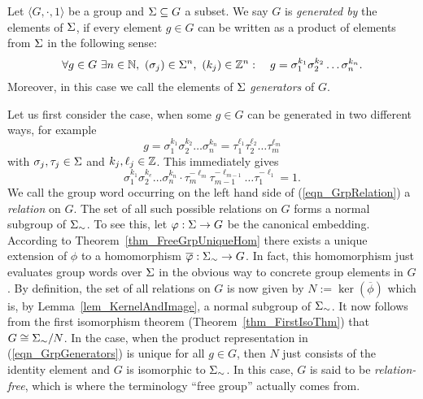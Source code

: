\begin{definition}
Let $\langle G, \cdot, 1 \rangle$ be a group and $\Sigma \subseteq G$ a subset. We say $G$ is \emph{generated by} the elements of $\Sigma$, if every element $g \in G$ can be written as a product of elements from $\Sigma$ in the following sense:
\begin{equation}
\label{eqn_GrpGenerators}
\forall g \in G\ \exists n \in \mathbb{N},\ (\sigma_j) \in \Sigma^n,\ (k_j) \in \mathbb{Z}^n:\quad 
g = \sigma_1^{k_1} \sigma_2^{k_2} \dots \sigma_n^{k_n}.
\end{equation}
Moreover, in this case we call the elements of $\Sigma$ \emph{generators} of $G$. 
\end{definition}

Let us first consider the case, when some $g \in G$ can be generated in two  different ways, for example
\begin{equation*}
g = \sigma_1^{k_1} \sigma_2^{k_2} \dots \sigma_n^{k_n} 
  = \tau_1^{\ell_1} \tau_2^{\ell_2} \dots \tau_m^{\ell_m}
\end{equation*}
with $\sigma_j, \tau_j \in \Sigma$ and $k_j, \ell_j \in \mathbb{Z}$. This immediately gives
\begin{equation}
\label{eqn_GrpRelation}
\sigma_1^{k_1} \sigma_2^{k_e} \dots \sigma_n^{k_n} \cdot
\tau_m^{-\ell_m} \tau_{m-1}^{-\ell_{m-1}} \dots \tau_1^{-\ell_1} = 1.
\end{equation}
We call the group word occurring on the left hand side of (\ref{eqn_GrpRelation}) a \emph{relation} on $G$. The set of all such possible relations on $G$ forms a normal subgroup of ${\Sigma}_{\sim}$. To see this, let $\varphi : \Sigma \to G$ be the canonical embedding. According to Theorem~\ref{thm_FreeGrpUniqueHom} there exists a unique extension of $\phi$ to a homomorphism $\overline{\varphi}: {\Sigma}_{\sim} \to G$. In fact, this homomorphism just evaluates group words over $\Sigma$ in the obvious way to concrete group elements in $G$. By definition, the set of all relations on $G$ is now given by $N := \ker(\overline{\phi})$ which is, by Lemma~\ref{lem_KernelAndImage}, a normal subgroup of ${\Sigma}_{\sim}$. It now follows from the first isomorphism theorem (Theorem~\ref{thm_FirstIsoThm}) that $G \cong {\Sigma}_{\sim} / N$. In the case, when the product representation in (\ref{eqn_GrpGenerators}) is unique for all $g \in G$, then $N$ just consists of the identity element and $G$ is isomorphic to ${\Sigma}_{\sim}$. In this case, $G$ is said to be \emph{relation-free}, which is where the terminology ``free group'' actually comes from. 


